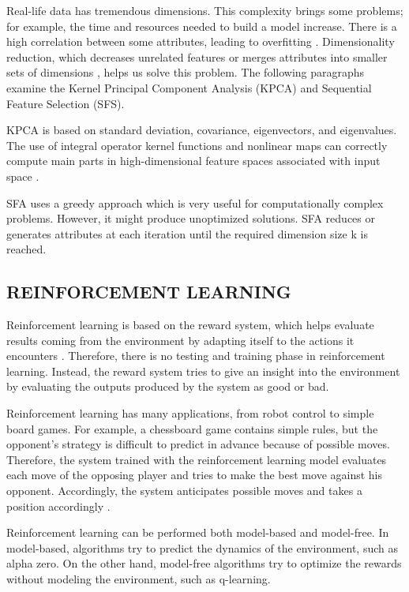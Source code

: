 Real-life data has tremendous dimensions. This complexity brings some problems; for example, the time and resources needed to build a model increase. There is a high correlation between some attributes, leading to overfitting \cite{sonawale2015dimensionality}. Dimensionality reduction, which decreases unrelated features or merges attributes into smaller sets of dimensions \cite{biricik2012comparing}, helps us solve this problem. The following paragraphs examine the Kernel Principal Component Analysis (KPCA) and Sequential Feature Selection (SFS). 

KPCA is based on standard deviation, covariance, eigenvectors, and eigenvalues. The use of integral operator kernel functions and nonlinear maps can correctly compute main parts in high-dimensional feature spaces associated with input space \cite{scholkopf1997kernel}.

SFA uses a greedy approach which is very useful for computationally complex problems. However, it might produce unoptimized solutions. SFA reduces or generates attributes at each iteration until the required dimension size k is reached.

\subsection{REINFORCEMENT LEARNING}

Reinforcement learning is based on the reward system, which helps evaluate results coming from the environment by adapting itself to the actions it encounters  \cite{sutton2018reinforcement}. Therefore, there is no testing and training phase in reinforcement learning. Instead, the reward system tries to give an insight into the environment by evaluating the outputs produced by the system as good or bad.

Reinforcement learning has many applications, from robot control to simple board games. For example, a chessboard game contains simple rules, but the opponent's strategy is difficult to predict in advance because of possible moves. Therefore, the system trained with the reinforcement learning model evaluates each move of the opposing player and tries to make the best move against his opponent. Accordingly, the system anticipates possible moves and takes a position accordingly \cite{alpaydin2020introduction}.

Reinforcement learning can be performed both model-based and model-free. In model-based, algorithms try to predict the dynamics of the environment, such as alpha zero. On the other hand, model-free algorithms try to optimize the rewards without modeling the environment, such as q-learning.

